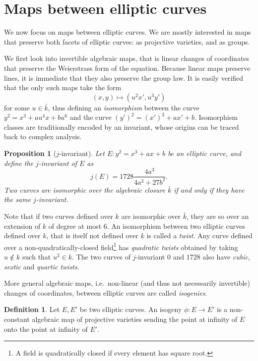 \documentclass[10pt]{article}
\theoremstyle{plain}
\newtheorem{proposition}[theorem]{Proposition}
\theoremstyle{definition}
\newtheorem{definition}[theorem]{Definition}
\begin{document}
\section{Maps between elliptic curves}

We now focus on maps between elliptic curves. %
We are mostly interested in maps that preserve both facets of elliptic
curves: as projective varieties, and as groups. %

We first look into invertible algebraic maps, that is linear changes
of coordinates that preserve the Weierstrass form of the equation. %
Because linear maps preserve lines, it is immediate that they also
preserve the group law. %
It is easily verified that the only such maps take the form
\[(x,y) \mapsto (u^2x', u^3y')\] %
for some $u∈\bar{k}$, thus defining an \emph{isomorphism} between the
curve $y^2=x^3+au^4x+bu^6$ and the curve $(y')^2 = (x')^3 + ax' +
b$. %
Isomorphism classes are traditionally encoded by an invariant, whose
origins can be traced back to complex analysis.

\begin{proposition}[$j$-invariant]
  \label{th:j}
  Let $E:y^2=x^3+ax+b$ be an elliptic curve, and define the
  \emph{$j$-invariant} of $E$ as
  \[j(E) = 1728\frac{4a^3}{4a^3+27b^2}.\] %
  Two curves are isomorphic over the algebraic closure $\bar{k}$ if
  and only if they have the same $j$-invariant.
\end{proposition}

Note that if two curves defined over $k$ are isomorphic over
$\bar{k}$, they are so over an extension of $k$ of degree at most
$6$. %
An isomorphism between two elliptic curves defined over $k$, that is
itself not defined over $k$ is called a \emph{twist}. %
Any curve defined over a non-quadratically-closed field\footnote{A
  field is quadratically closed if every element has square root.} has
\emph{quadratic twists} obtained by taking $u∉k$ such that $u^2∈k$. %
The two curves of $j$-invariant $0$ and $1728$ also have \emph{cubic},
\emph{sextic} and \emph{quartic twists}.

More general algebraic maps, i.e.\ non-linear (and thus not
necessarily invertible) changes of coordinates, between elliptic
curves are called \emph{isogenies}.

\begin{definition}
  Let $E,E'$ be two elliptic curves. %
  An isogeny $\phi:E→E'$ is a non-constant algebraic map of projective
  varieties sending the point at infinity of $E$ onto the point at
  infinity of $E'$.
\end{definition}
\end{document}
